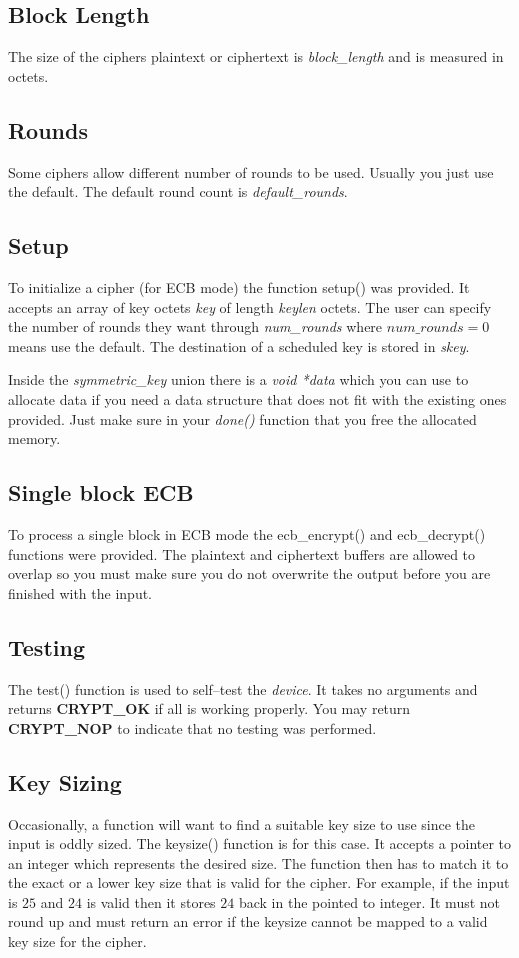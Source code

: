 \documentclass[synpaper]{book}
\begin{document}
\subsection{Block Length}
The size of the ciphers plaintext or ciphertext is \textit{block\_length} and is measured in octets.

\subsection{Rounds}
Some ciphers allow different number of rounds to be used.  Usually you just use the default.  The default round count is \textit{default\_rounds}.

\subsection{Setup}
To initialize a cipher (for ECB mode) the function setup() was provided.  It accepts an array of key octets \textit{key} of length \textit{keylen} octets.  The user
can specify the number of rounds they want through \textit{num\_rounds} where $num\_rounds = 0$ means use the default.  The destination of a scheduled key is stored
in \textit{skey}.

Inside the \textit{symmetric\_key} union there is a \textit{void *data} which you can use to allocate data if you need a data structure that does not fit with the existing
ones provided.  Just make sure in your \textit{done()} function that you free the allocated memory.

\subsection{Single block ECB}
To process a single block in ECB mode the ecb\_encrypt() and ecb\_decrypt() functions were provided.  The plaintext and ciphertext buffers are allowed to overlap so you 
must make sure you do not overwrite the output before you are finished with the input.

\subsection{Testing}
The test() function is used to self--test the \textit{device}.  It takes no arguments and returns \textbf{CRYPT\_OK} if all is working properly.  You may return
\textbf{CRYPT\_NOP} to indicate that no testing was performed.

\subsection{Key Sizing}
Occasionally, a function will want to find a suitable key size to use since the input is oddly sized.  The keysize() function is for this case.  It accepts a 
pointer to an integer which represents the desired size.  The function then has to match it to the exact or a lower key size that is valid for the cipher.  For
example, if the input is $25$ and $24$ is valid then it stores $24$ back in the pointed to integer.  It must not round up and must return an error if the keysize
 cannot be mapped to a valid key size for the cipher.
\end{document}

